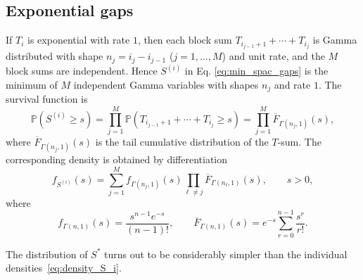 \documentclass[a4paper,reqno,11pt]{amsart}
\numberwithin{equation}{section}
\numberwithin{thm}{section}
\theoremstyle{plain}
\theoremstyle{definition}
\begin{document}
{\subsection{Exponential gaps}
\label{sec:exp} 
If $T_i$ is exponential with rate $1$, then each block sum
$
T_{i_{j-1}+1}+\cdots+T_{i_j}
$
is Gamma distributed with shape $n_j=i_j-i_{j-1}$ ($j=1,\ldots,M$) and unit rate, and the $M$ block sums are independent. 
Hence $S^{(i)}$ in Eq. \eqref{eq:min_spac_gaps} is the minimum of $M$ independent Gamma variables with shapes $n_j$ and rate $1$. The survival function is
\begin{equation}
    \mathbb P(S^{(i)}\ge s)
=
\prod_{j=1}^M \mathbb P(T_{i_{j-1}+1}+\cdots+T_{i_j}\ge s)
=
\prod_{j=1}^M \overline{F}_{\Gamma(n_j,1)}(s),
\end{equation}
{where $\overline{F}_{\Gamma(n_j,1)}(s)$ is the tail cumulative distribution of the $T$-sum.}
The corresponding density is obtained by differentiation
\begin{equation}
\label{eq:density_S_i}
f_{S^{(i)}}(s)
=
\sum_{j=1}^M
f_{\Gamma(n_j,1)}(s)
\prod_{\ell\ne j}\overline F_{\Gamma(n_\ell,1)}(s),\qquad s>0,
\end{equation}
where
\[
f_{\Gamma(n,1)}(s)=\frac{s^{n-1}e^{-s}}{(n-1)!},
\qquad
\overline F_{\Gamma(n,1)}(s)=e^{-s}\sum_{r=0}^{n-1}\frac{s^r}{r!} .
\]




The distribution of $S^*$ turns out to be considerably simpler than the individual densities~\eqref{eq:density_S_i}. 


}
\end{document}
